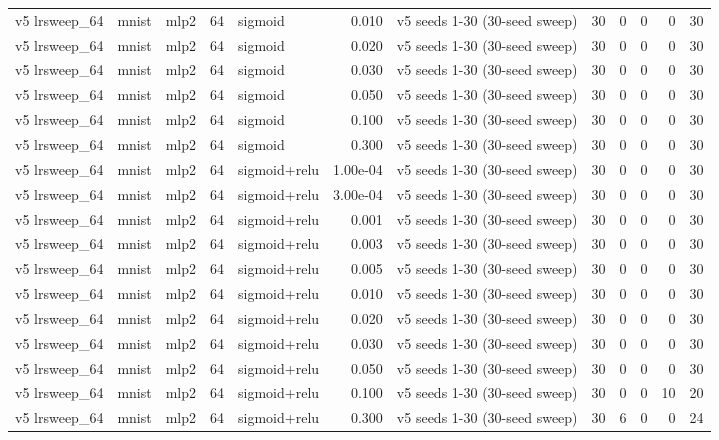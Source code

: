 \begin{table}[htbp]
{\begin{tabular}{@{}lllrlrlrrrrr@{}}
v5 lrsweep\_64 & mnist & mlp2 & 64 & sigmoid & 0.010 & v5 seeds 1-30 (30-seed sweep) & 30 & 0 & 0 & 0 & 30 \\
v5 lrsweep\_64 & mnist & mlp2 & 64 & sigmoid & 0.020 & v5 seeds 1-30 (30-seed sweep) & 30 & 0 & 0 & 0 & 30 \\
v5 lrsweep\_64 & mnist & mlp2 & 64 & sigmoid & 0.030 & v5 seeds 1-30 (30-seed sweep) & 30 & 0 & 0 & 0 & 30 \\
v5 lrsweep\_64 & mnist & mlp2 & 64 & sigmoid & 0.050 & v5 seeds 1-30 (30-seed sweep) & 30 & 0 & 0 & 0 & 30 \\
v5 lrsweep\_64 & mnist & mlp2 & 64 & sigmoid & 0.100 & v5 seeds 1-30 (30-seed sweep) & 30 & 0 & 0 & 0 & 30 \\
v5 lrsweep\_64 & mnist & mlp2 & 64 & sigmoid & 0.300 & v5 seeds 1-30 (30-seed sweep) & 30 & 0 & 0 & 0 & 30 \\
v5 lrsweep\_64 & mnist & mlp2 & 64 & sigmoid+relu & 1.00e-04 & v5 seeds 1-30 (30-seed sweep) & 30 & 0 & 0 & 0 & 30 \\
v5 lrsweep\_64 & mnist & mlp2 & 64 & sigmoid+relu & 3.00e-04 & v5 seeds 1-30 (30-seed sweep) & 30 & 0 & 0 & 0 & 30 \\
v5 lrsweep\_64 & mnist & mlp2 & 64 & sigmoid+relu & 0.001 & v5 seeds 1-30 (30-seed sweep) & 30 & 0 & 0 & 0 & 30 \\
v5 lrsweep\_64 & mnist & mlp2 & 64 & sigmoid+relu & 0.003 & v5 seeds 1-30 (30-seed sweep) & 30 & 0 & 0 & 0 & 30 \\
v5 lrsweep\_64 & mnist & mlp2 & 64 & sigmoid+relu & 0.005 & v5 seeds 1-30 (30-seed sweep) & 30 & 0 & 0 & 0 & 30 \\
v5 lrsweep\_64 & mnist & mlp2 & 64 & sigmoid+relu & 0.010 & v5 seeds 1-30 (30-seed sweep) & 30 & 0 & 0 & 0 & 30 \\
v5 lrsweep\_64 & mnist & mlp2 & 64 & sigmoid+relu & 0.020 & v5 seeds 1-30 (30-seed sweep) & 30 & 0 & 0 & 0 & 30 \\
v5 lrsweep\_64 & mnist & mlp2 & 64 & sigmoid+relu & 0.030 & v5 seeds 1-30 (30-seed sweep) & 30 & 0 & 0 & 0 & 30 \\
v5 lrsweep\_64 & mnist & mlp2 & 64 & sigmoid+relu & 0.050 & v5 seeds 1-30 (30-seed sweep) & 30 & 0 & 0 & 0 & 30 \\
v5 lrsweep\_64 & mnist & mlp2 & 64 & sigmoid+relu & 0.100 & v5 seeds 1-30 (30-seed sweep) & 30 & 0 & 0 & 10 & 20 \\
v5 lrsweep\_64 & mnist & mlp2 & 64 & sigmoid+relu & 0.300 & v5 seeds 1-30 (30-seed sweep) & 30 & 6 & 0 & 0 & 24 \\

\end{tabular}}
\end{table}
